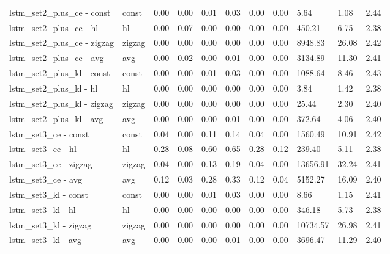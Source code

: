 \begin{longtable}{|p{1.3cm}|p{1.3cm}|p{1.3cm}|p{1.3cm}|p{1.3cm}|p{1.3cm}|p{1.3cm}|p{1.3cm}|p{1.3cm}|p{1.3cm}|p{1.3cm}|}
lstm_set2_plus_ce - const & const & 0.00 & 0.00 & 0.01 & 0.03 & 0.00 & 0.00 & 5.64 & 1.08 & 2.44 \\
lstm_set2_plus_ce - hl & hl & 0.00 & 0.07 & 0.00 & 0.00 & 0.00 & 0.00 & 450.21 & 6.75 & 2.38 \\
lstm_set2_plus_ce - zigzag & zigzag & 0.00 & 0.00 & 0.00 & 0.00 & 0.00 & 0.00 & 8948.83 & 26.08 & 2.42 \\
lstm_set2_plus_ce - avg & avg & 0.00 & 0.02 & 0.00 & 0.01 & 0.00 & 0.00 & 3134.89 & 11.30 & 2.41 \\
lstm_set2_plus_kl - const & const & 0.00 & 0.00 & 0.01 & 0.03 & 0.00 & 0.00 & 1088.64 & 8.46 & 2.43 \\
lstm_set2_plus_kl - hl & hl & 0.00 & 0.00 & 0.00 & 0.00 & 0.00 & 0.00 & 3.84 & 1.42 & 2.38 \\
lstm_set2_plus_kl - zigzag & zigzag & 0.00 & 0.00 & 0.00 & 0.00 & 0.00 & 0.00 & 25.44 & 2.30 & 2.40 \\
lstm_set2_plus_kl - avg & avg & 0.00 & 0.00 & 0.00 & 0.01 & 0.00 & 0.00 & 372.64 & 4.06 & 2.40 \\
lstm_set3_ce - const & const & 0.04 & 0.00 & 0.11 & 0.14 & 0.04 & 0.00 & 1560.49 & 10.91 & 2.42 \\
lstm_set3_ce - hl & hl & 0.28 & 0.08 & 0.60 & 0.65 & 0.28 & 0.12 & 239.40 & 5.11 & 2.38 \\
lstm_set3_ce - zigzag & zigzag & 0.04 & 0.00 & 0.13 & 0.19 & 0.04 & 0.00 & 13656.91 & 32.24 & 2.41 \\
lstm_set3_ce - avg & avg & 0.12 & 0.03 & 0.28 & 0.33 & 0.12 & 0.04 & 5152.27 & 16.09 & 2.40 \\
lstm_set3_kl - const & const & 0.00 & 0.00 & 0.01 & 0.03 & 0.00 & 0.00 & 8.66 & 1.15 & 2.41 \\
lstm_set3_kl - hl & hl & 0.00 & 0.00 & 0.00 & 0.00 & 0.00 & 0.00 & 346.18 & 5.73 & 2.38 \\
lstm_set3_kl - zigzag & zigzag & 0.00 & 0.00 & 0.00 & 0.00 & 0.00 & 0.00 & 10734.57 & 26.98 & 2.41 \\
lstm_set3_kl - avg & avg & 0.00 & 0.00 & 0.00 & 0.01 & 0.00 & 0.00 & 3696.47 & 11.29 & 2.40 \\
\hline
\end{longtable}